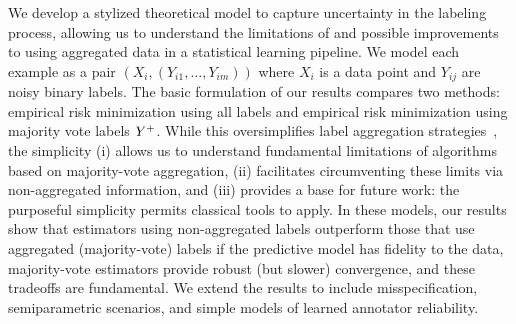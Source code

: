

We develop a stylized theoretical model to capture uncertainty in the
labeling process, allowing us to understand the limitations of and possible
improvements to using aggregated data in a statistical learning pipeline.
%
We model each example as a pair $(X_i, (Y_{i1},\dots,Y_{im}))$ where $X_i$
is a data point and $Y_{ij}$ are noisy binary labels.
%
The basic
formulation of our results compares two methods: empirical risk
minimization using all labels and empirical risk minimization using
majority vote labels $Y^+$.
%
While this oversimplifies label
aggregation strategies~\cite{DawidSk79, RussakovskyDeSuKrSaMaHuKaKhBeBeFe15,
  RatnerBaEhFrWuRe17},
the simplicity (i) allows us to understand
fundamental limitations of algorithms based on majority-vote aggregation,
(ii) facilitates circumventing these limits via non-aggregated
information, and (iii) provides a base for future work: the purposeful
simplicity permits classical tools to apply.
%
In these models, our results show that estimators using non-aggregated labels
outperform those that use aggregated (majority-vote)
labels if the predictive model has fidelity to the data,
majority-vote estimators provide robust (but slower) convergence, and these
tradeoffs are fundamental.
%
We extend the results to include misspecification, semiparametric
scenarios, and simple models of learned annotator reliability.

